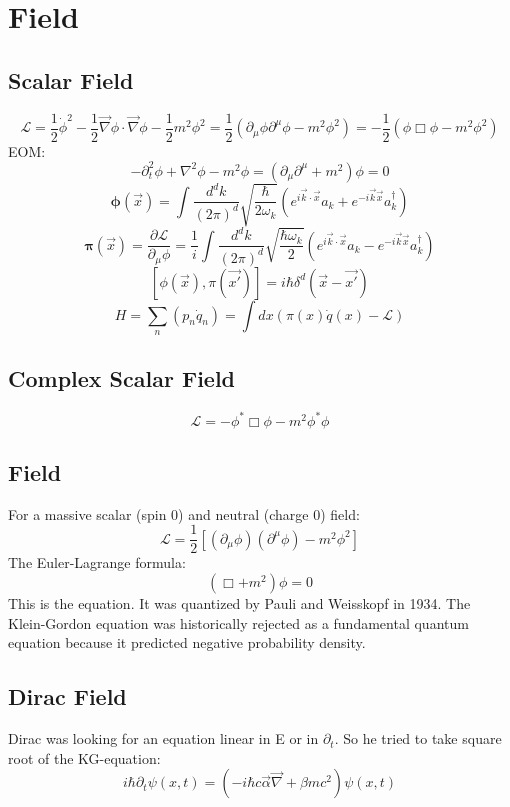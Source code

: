 \section{Field}
\subsection{Scalar Field}
\[ \mathcal{L} = \frac{1}{2}\dot{\phi}^{2} -
\frac{1}{2}\vec{\nabla}\phi \cdot \vec{\nabla}\phi - \frac{1}{2}m^{2}\phi^{2} 
= \frac{1}{2}(\partial_{\mu}\phi\partial^{\mu}\phi - m^{2}\phi^{2}) 
=-\frac{1}{2}(\phi\Box\phi-m^2\phi^2)	\]
EOM:
$$ -\partial_{t}^{2}\phi + \nabla^{2}\phi - m^{2}\phi =
(\partial_{\mu}\partial^{\mu} + m^{2}) \phi = 0 $$
$$ \pmb{\phi}(\vec{x}) = \int
\frac{d^{d}k}{(2\pi)^{d}}\sqrt{\frac{\hbar}{2\omega_{k}}}(e^{i\vec{k}\cdot\vec{x}}a_{k}+e^{-i\vec{k}\vec{x}}a_{k}^{\dag})$$
$$ \pmb{\pi}(\vec{x}) = \frac{\partial{\mathcal{L}}}{\partial_{\mu}\phi} =
\frac{1}{i} \int \frac{d^{d}k}{(2\pi)^{d}}\sqrt{\frac{\hbar\omega_{k}}{2}}(e^{i\vec{k}\cdot\vec{x}}a_{k}-e^{-i\vec{k}\vec{x}}a_{k}^{\dag}) $$
$$ [\phi(\vec{x}), \pi(\vec{x'})] = i\hbar\delta^{d}(\vec{x} - \vec{x'})$$
$$ H =\sum_{n}(p_{n}\dot{q}_n) = \int dx(\pi(x)\dot{q}(x) -
\mathcal{L})  $$

\subsection{Complex Scalar Field}
\[  \mathcal{L}=-\phi^*\Box\phi-m^2\phi^*\phi\]

\subsection{\KG{} Field}
For a massive scalar (spin 0) and neutral (charge 0) field:
$$\mathcal{L} = \frac{1}{2} [(\partial_{\mu}\phi)(\partial^{\mu}\phi) -
m^{2} \phi^{2}]$$
The Euler-Lagrange formula:
$$ (\Box + m^{2})\phi = 0$$
This is the \KG{} equation. It was quantized by Pauli and Weisskopf in 1934.
The Klein-Gordon equation was historically rejected as a fundamental quantum
equation because it predicted negative probability density.


\subsection{Dirac Field}
Dirac was looking for an equation linear in E or in $\partial_t$. So he tried
to take square root of the KG-equation:
\begin{equation}
    i\hbar\partial_t\psi(x, t) = (-i\hbar c\vec{\alpha}\vec{\nabla} + \beta mc^2)\psi(x, t)
    \label{eq:Dirac.0}
\end{equation}

